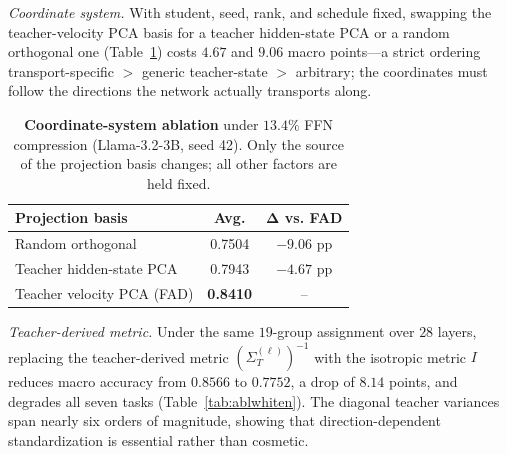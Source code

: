 \documentclass[letterpaper]{article} %
\newcommand{\bSigma}{\varSigma}
\newcommand{\bI}{I}
\theoremstyle{plain}
\theoremstyle{definition}
\begin{document}
{\emph{Coordinate system.} With student, seed, rank, and schedule fixed, swapping
the teacher-velocity PCA basis for a teacher hidden-state PCA or a random
orthogonal one (Table~\ref{tab:projection-main}) costs $4.67$ and $9.06$ macro
points---a strict ordering transport-specific $>$ generic teacher-state $>$
arbitrary; the coordinates must follow the directions the network actually
transports along.

\begin{table}[t]
\centering\small
\renewcommand{\arraystretch}{0.98}
\setlength{\tabcolsep}{5pt}
\begin{tabular}{@{}lcc@{}}
\toprule
\textbf{Projection basis} & \textbf{Avg.}
& $\boldsymbol{\Delta}$ \textbf{vs. FAD} \\
\midrule
Random orthogonal          & 0.7504 & $-9.06$ pp \\
Teacher hidden-state PCA   & 0.7943 & $-4.67$ pp \\
Teacher velocity PCA (FAD) & \textbf{0.8410} & -- \\
\bottomrule
\end{tabular}
\caption{\textbf{Coordinate-system ablation} under $13.4\%$ FFN compression
(Llama-3.2-3B, seed 42). Only the source of the projection basis changes; all
other factors are held fixed.}
\label{tab:projection-main}
\end{table}

\emph{Teacher-derived metric.}
Under the same $19$-group assignment over $28$ layers, replacing the teacher-derived metric
$(\bSigma_T^{(\ell)})^{-1}$ with the isotropic metric $\bI$
reduces macro accuracy from $0.8566$ to $0.7752$, a drop of
$8.14$ points, and degrades all seven tasks
(Table~\ref{tab:ablwhiten}). The diagonal teacher variances span nearly six orders of magnitude, showing that direction-dependent standardization is essential rather than cosmetic.

}
\end{document}
